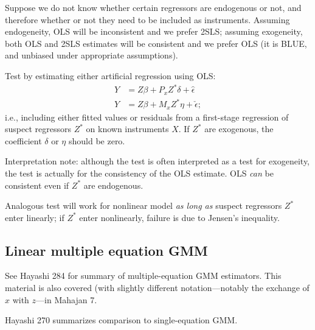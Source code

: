 \documentclass[8pt,letterpaper, landscape]{extarticle} %
\begin{document}
\begin{multicols}{3}
\begin{description}
 Suppose we do not know whether certain regressors are endogenous or not, and therefore whether or not they need to be included as instruments. Assuming endogeneity, OLS will be inconsistent and we prefer 2SLS; assuming exogeneity, both OLS and 2SLS estimates will be consistent and we prefer OLS (it is BLUE, and unbiased under appropriate assumptions).

Test by estimating either artificial regression using OLS:
\begin{align*}
Y &= Z \beta + P_x Z^* \delta + \hat{\epsilon} \\
Y &= Z \beta + M_x Z^* \eta + \check{\epsilon};
\end{align*}
i.e., including either fitted values or residuals from a first-stage regression of suspect regressors $ Z^* $ on known instruments $ X $. If $ Z^* $ are exogenous, the coefficient $ \delta $ or $ \eta $ should be zero.

Interpretation note: although the test is often interpreted as a test for exogeneity, the test is actually for the consistency of the OLS estimate. OLS \textit{can} be consistent even if $ Z^* $ are endogenous.

Analogous test will work for nonlinear model \textit{as long as} suspect regressors $ Z^* $ enter linearly; if $ Z^* $ enter nonlinearly, failure is due to Jensen's inequality.

\subsection{Linear multiple equation GMM}
See Hayashi 284 for summary of multiple-equation GMM estimators. This material is also covered (with slightly different notation---notably the exchange of $ x $ with $ z $---in Mahajan 7.

 Hayashi 270 summarizes comparison to single-equation GMM.


\end{description}
\end{multicols}
\end{document}
